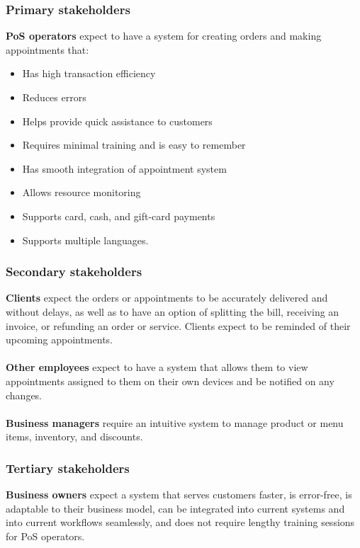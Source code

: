 \documentclass{article}
\begin{document}
\subsubsection{Primary stakeholders}
\textbf{PoS operators} expect to have a system for creating orders and making appointments that:
\begin{itemize}
    \item Has high transaction efficiency
    \item Reduces errors
    \item Helps provide quick assistance to customers
    \item Requires minimal training and is easy to remember
    \item Has smooth integration of appointment system
    \item Allows resource monitoring
    \item Supports card, cash, and gift-card payments
    \item Supports multiple languages.
\end{itemize}


\subsubsection{Secondary stakeholders}

\textbf{Clients} expect the orders or appointments to be accurately delivered and without delays, as well as to have an option of splitting the bill, receiving an invoice, or refunding an order or service. Clients expect to be reminded of their upcoming appointments.
\textbf{\\ \\Other employees} expect to have a system that allows them to view appointments assigned to them on their own devices and be notified on any changes.
\textbf{\\ \\Business managers} require an intuitive system to manage product or menu items, inventory, and discounts.

\subsubsection{Tertiary stakeholders}

\textbf{Business owners} expect a system that serves customers faster, is error-free, is adaptable to their business model, can be integrated into current systems and into current workflows seamlessly, and does not require lengthy training sessions for PoS operators.
\newpage
\end{document}
